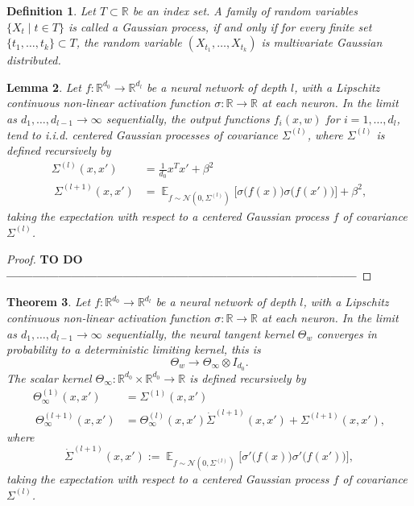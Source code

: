 \documentclass[11pt, a4paper]{article}
\newtheorem{theorem}{Theorem}[section]
\newtheorem{lemma}[theorem]{Lemma}
\newtheorem{definition}[theorem]{Definition}
\newcommand{\R}{\mathds{R}}
\DeclareMathOperator*{\E}{\mathds{E}}
\begin{document}
\begin{definition}
Let $T \subset \R$ be an index set. A family of random variables $\{ X_t \mid t \in T \}$ is called a Gaussian process, if and only if for every finite set $\{ t_1, \dots, t_k \} \subset T$, the random variable $(X_{t_1}, \dots, X_{t_k})$ is multivariate Gaussian distributed.
\end{definition}

\begin{lemma}
Let $f: \R^{d_0} \to \R^{d_l}$ be a neural network of depth $l$, with a Lipschitz continuous non-linear activation function $\sigma: \R \to \R$ at each neuron. In the limit as $d_1, \dots, d_{l-1} \to \infty$ sequentially, the output functions $f_i(x,w)$ for $i=1, \dots, d_l$, tend to i.i.d. centered Gaussian processes of covariance $\Sigma^{(l)}$, where $\Sigma^{(l)}$ is defined recursively by
\[ \begin{split}
\Sigma^{(l)}(x,x') &= \frac{1}{d_0} x^Tx' + \beta^2 \\\
\Sigma^{(l+1)}(x,x') &= \E_{f \sim \mathcal{N}(0, \Sigma^{(l)})} \Big [ \sigma \big ( f(x) \big ) \sigma \big ( f(x') \big) \Big ] + \beta^2,
\end{split} \]
taking the expectation with respect to a centered Gaussian process $f$ of covariance $\Sigma^{(l)}$.
\end{lemma}

\begin{proof}
\textbf{TO DO ---------------------------------------------------------------------------------}
\end{proof}

\begin{theorem}
Let $f: \R^{d_0} \to \R^{d_l}$ be a neural network of depth $l$, with a Lipschitz continuous non-linear activation function $\sigma: \R \to \R$ at each neuron. In the limit as $d_1, \dots, d_{l-1} \to \infty$ sequentially, the neural tangent kernel $\Theta_w$ converges in probability to a deterministic limiting kernel, this is
\[ \Theta_w \to \Theta_{\infty} \otimes I_{d_0}. \]
The scalar kernel $\Theta_{\infty} : \R^{d_0} \times \R^{d_0} \to \R$ is defined recursively by
\[ \begin{split} 
\Theta_{\infty}^{(1)} (x,x') &= \Sigma^{(1)}(x,x') \\\
\Theta_{\infty}^{(l+1)}(x,x') &= \Theta_{\infty}^{(l)}(x,x') \dot{\Sigma}^{(l+1)}(x,x') + \Sigma^{(l+1)}(x,x'),
\end{split} \]
where 
\[ \dot{\Sigma}^{(l+1)}(x,x') := \E_{f \sim \mathcal{N}(0, \Sigma^{(l)})} \Big [ \sigma' \big ( f(x) \big ) \sigma' \big ( f(x') \big) \Big ], \]
taking the expectation with respect to a centered Gaussian process $f$ of covariance $\Sigma^{(l)}$.
\end{theorem}
\end{document}

